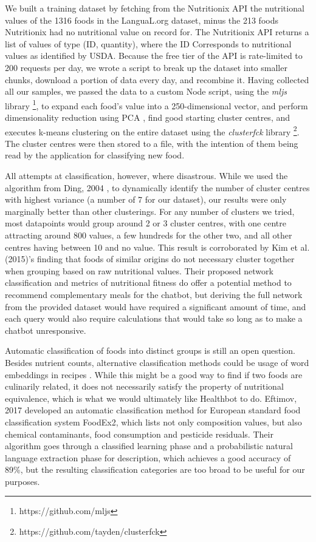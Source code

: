 We built a training dataset by fetching from the Nutritionix API the nutritional values of the 1316 foods in the LanguaL.org dataset, minus the 213 foods Nutritionix had no nutritional value on record for. The Nutritionix API returns a list of values of type (ID, quantity), where the ID Corresponds to nutritional values as identified by USDA. Because the free tier of the API is rate-limited to 200 requests per day, we wrote a script to break up the dataset into smaller chunks, download a portion of data every day, and recombine it. Having collected all our samples, we passed the data to a custom Node script, using the \textit{mljs} library \footnote{https://github.com/mljs}, to expand each food's value into a 250-dimensional vector, and perform dimensionality reduction using PCA \cite{Ding2004}, find good starting cluster centres, and executes k-means clustering on the entire dataset using the \textit{clusterfck} library \footnote{https://github.com/tayden/clusterfck}. The cluster centres were then stored to a file, with the intention of them being read by the application for classifying new food. 

All attempts at classification, however, where disastrous. While we used the algorithm from Ding, 2004 \cite{Ding2004}, to dynamically identify the number of cluster centres with highest variance (a number of 7 for our dataset), our results were only marginally better than other clusterings. For any number of clusters we tried, most datapoints would group around 2 or 3 cluster centres, with one centre attracting around 800 values, a few hundreds for the other two, and all other centres having between 10 and no value. This result is corroborated by Kim et al. (2015)\cite{Kim2015a}'s finding that foods of similar origins do not necessary cluster together when grouping based on raw nutritional values. Their proposed network classification and metrics of nutritional fitness do offer a potential method to recommend complementary meals for the chatbot, but deriving the full network from the provided dataset would have required a significant amount of time, and each query would also require calculations that would take so long as to make a chatbot unresponsive.

Automatic classification of foods into distinct groups is still an open question. Besides nutrient counts, alternative classification methods could be usage of word embeddings in recipes \cite{food2vec}. While this might be a good way to find if two foods are culinarily related, it does not necessarily satisfy the property of nutritional equivalence, which is what we would ultimately like Healthbot to do.
Eftimov, 2017 \cite{Eftimov2017} developed an automatic classification method for European standard food classification system FoodEx2, which lists not only composition values, but also chemical contaminants, food consumption and pesticide residuals. Their algorithm goes through a classified learning phase and a probabilistic natural language extraction phase for description, which achieves a good accuracy of 89\%, but the resulting classification categories are too broad to be useful for our purposes.


